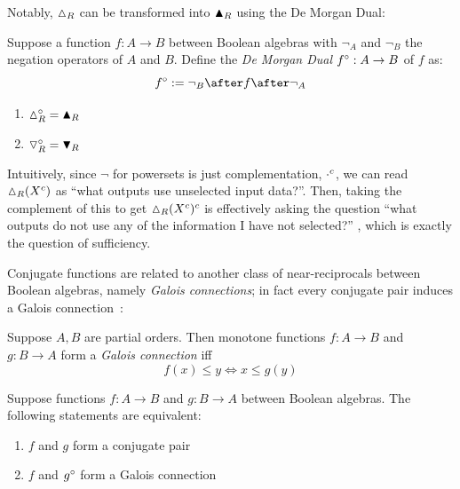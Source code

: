 Notably, $\demandedByR_R$ can be transformed into $\blacktriangle_R$ using the De Morgan Dual:

\begin{definition}
   \label{def:conjugate:de-morgan-dual}
   Suppose a function $f: A \to B$ between Boolean algebras with $\neg_A$ and $\neg_B$ the negation operators
   of $A$ and $B$. Define the \textit{De Morgan Dual} $f^{\circ}: A \to B$ of $f$ as:
   \[ \dual{f} \eqdef \neg_B \after f \after \neg_A \]
\end{definition}

\begin{lemma}
   \label{lem:conjugate:image-preimage-duality}
   \item
   \begin{enumerate}
      \item $\dual{\demandedByR_R} = \sufficesR_R$
      \item $\triangledown_R^{\circ} = \blacktriangledown_R$
   \end{enumerate}
\end{lemma}

Intuitively, since $\neg$ for powersets is just complementation, $\cdot^{c}$, we can read
$\demandedByR_{R}(\compl{X})$ as ``what outputs use unselected input data?''. Then, taking the complement of
this to get $\compl{\demandedByR_{R}(\compl{X})}$ is effectively asking the question ``what outputs do not use
any of the information I have not selected?'' , which is exactly the question of
sufficiency.

Conjugate functions are related to another class of near-reciprocals between Boolean algebras, namely
\emph{Galois connections}; in fact every conjugate pair induces a Galois connection~\cite{menni14}:

\begin{definition}
   \label{def:conjugate:galois-connection}
   Suppose $A, B$ are partial orders. Then monotone functions $f: A \to B$ and $g: B \to A$ form a \textit{Galois
   connection} iff
   \[ f(x) \leq y \iff x \leq g(y) \]
\end{definition}

\begin{proposition}
   \label{prop:conj-galois-correspond}
   Suppose functions $f: A \to B$ and $g: B \to A$ between Boolean algebras. The following statements are
   equivalent:
   \begin{enumerate}
      \item $f$ and $g$ form a conjugate pair
      \item $f$ and $g^{\circ}$ form a Galois connection
   \end{enumerate}
\end{proposition}

